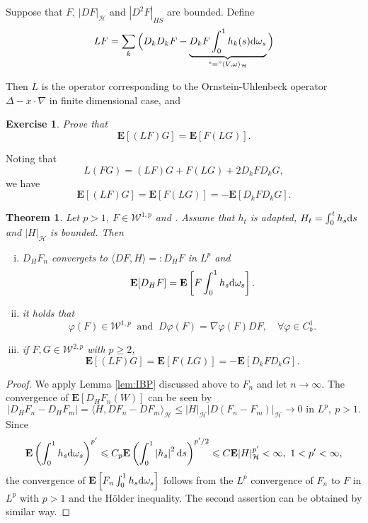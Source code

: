 \documentclass[twoside, 12pt]{book}
\numberwithin{equation}{chapter}
\newtheorem{theorem}{Theorem}[section]
\newtheorem{exercise}{Exercise}[section]
\def\cH{{\mathcal H}}
\def\bE{{\mathbf E}}
\def\sW{{\mathscr W}}
\def\l{\left}
\def\r{\right}
\def\<{\langle}
\def\>{\rangle}
\def\geq{\geqslant}
\def\leq{\leqslant}
\def\d{\text{\rm{d}}}
\begin{document}
    Suppose that $F$, $|DF|_{\cH}$ and $|D^2F|_{HS}$ are bounded. Define 
   \[
   L F = \sum_k \Big(D_kD_kF-\underbrace{D_k F \int_0^1 h_k(s) \d \omega_s}_{``=" \<V, \omega\>_\cH}\Big)
   \]

    

    \medspace
    
    
   
    Then $L$ is the operator corresponding to the Ornstein-Uhlenbeck operator $\Delta-x\cdot \nabla$ in finite dimensional case, and 
    \begin{exercise}
    	Prove that 
    	\[
    	    \bE [(LF)G]=\bE [F (LG)]. 
    	\]
    \end{exercise}
    Noting that 
    \[
        L(FG)=(LF) G+ F(LG)+2D_kFD_kG, 
    \]
    we have 
    \begin{equation*}
    	\bE [(LF)G]=\bE [F (LG)]=-\bE [D_kFD_kG]. 
    \end{equation*}
    
    
    \begin{theorem}\label{thm:IBP}
         Let $p > 1$, $F\in \sW^{1,p}$ and . Assume that $h_t$ is adapted, $H_t=\int_0^t h_s \d s$ and $|H|_{\cH}$ is bounded. Then 
         \begin{enumerate}[(i)]
         	\item   $D_HF_n$ convergets to $\<DF, H\>=:D_H F$ in $L^p$ and 
         	\[
         	    \mathbf{E}[D_H F] =\mathbf{E}\left[F \int_0^1 h_s \d \omega_s\right]. 
         	\]
         	\item it holds that 
         	\[
         	    \varphi(F)\in \sW^{1,p} ~ \mbox{ and }~ D \varphi(F)=\nabla \varphi(F)D F, \quad \forall \varphi\in C^1_b. 
         	\]
         	\item if $F,G\in \sW^{2,p}$  with $p\geq 2$, 
         	\begin{equation}
         		\bE [(LF)G]=\bE [F (LG)]=-\bE [D_kFD_kG]. 
         	\end{equation}
         \end{enumerate}
    \end{theorem}
    \begin{proof}
        We apply Lemma \ref{lem:IBP} discussed above to $F_n$ and let $n \rightarrow \infty$. The convergence of $\mathbf{E}\left[D_H F_n(W)\right]$ can be seen by 
        $$
            |D_HF_n-D_H F_m|=\<H, DF_{n}-DF_{m}\>_{\cH} \leq |H|_{\cH} |D(F_n-F_m)|_{\cH} \to 0 \mbox{ in } L^p, ~ p > 1. 
        $$
        Since 
        \[
            \mathbf{E}\left(\int_0^1 h_s \d \omega_s\right)^{p'}\leq C_p\mathbf{E} \l(\int_0^1\left|h_s\right|^2\d s\r)^{p'/2} \leq C\bE |H|_{\cH}^{p'}<\infty, ~ 1<p'<\infty, 
        \] 
        the convergence of $\mathbf{E}\left[F_n \int_0^1 h_s \d \omega_s\right]$ follows from the $L^p$ convergence of $F_n$ to $F$ in $L^p$ with $p >1$ and the Hölder inequality. The second assertion can be obtained by similar way. 
    \end{proof}
    
\end{document}
